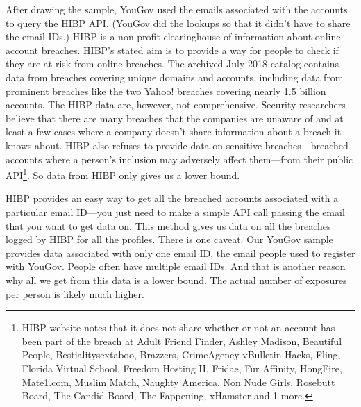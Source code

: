 \documentclass[sigconf]{acmart}
\begin{document}
After drawing the sample, YouGov used the emails associated with the accounts to query the HIBP API. (YouGov did the lookups so that it didn't have to share the email IDs.) HIBP is a non-profit clearinghouse of information about online account breaches. HIBP's stated aim is to provide a way for people to check if they are at risk from online breaches. The archived July 2018 catalog contains data from \catalogCount{} breaches covering \catalogDomains{} unique domains and \catalogAccounts{} accounts, including data from prominent breaches like the two Yahoo! breaches covering nearly 1.5 billion accounts. The HIBP data are, however, not comprehensive. Security researchers believe that there are many breaches that the companies are unaware of and at least a few cases where a company doesn't share information about a breach it knows about. HIBP also refuses to provide data on sensitive breaches---breached accounts where a person's inclusion may adversely affect them---from their public API\footnote{HIBP website notes that it does not share whether or not an account has been part of the breach at Adult Friend Finder, Ashley Madison, Beautiful People, Bestialitysextaboo, Brazzers, CrimeAgency vBulletin Hacks, Fling, Florida Virtual School, Freedom Hosting II, Fridae, Fur Affinity, HongFire, Mate1.com, Muslim Match, Naughty America, Non Nude Girls, Rosebutt Board, The Candid Board, The Fappening, xHamster and 1 more.}.  So data from HIBP only gives us a lower bound.

HIBP provides an easy way to get all the breached accounts associated with a particular email ID---you just need to make a simple API call passing the email that you want to get data on. This method gives us data on all the breaches logged by HIBP for all the \sampleSize{} profiles. There is one caveat.  Our YouGov sample provides data associated with only one email ID, the email people used to register with YouGov. People often have multiple email IDs. And that is another reason why all we get from this data is a lower bound. The actual number of exposures per person is likely much higher.
\end{document}
